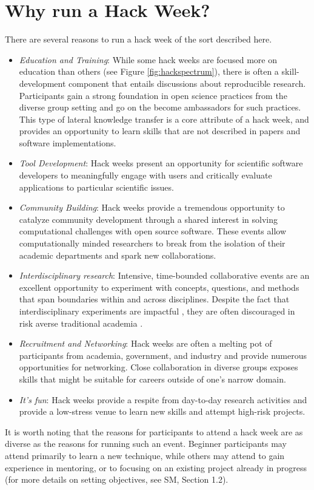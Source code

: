 \section*{Why run a Hack Week?}

There are several reasons to run a hack week of the sort described here.

\begin{itemize}
\item{\textit{Education and Training}:
While some hack weeks are focused more on education than others (see Figure \ref{fig:hackspectrum}), there is often a skill-development component that entails discussions about reproducible research. Participants gain a strong foundation in open science practices from the diverse group setting and go on the become ambassadors for such practices. This type of lateral knowledge transfer is a core attribute of a hack week, and provides an opportunity to learn skills that are not described in papers and software implementations.}

\item{\textit{Tool Development}: Hack weeks present an opportunity for scientific software developers to meaningfully engage with users and critically evaluate applications to particular scientific issues.}

\item{\textit{Community Building}: Hack weeks provide a tremendous opportunity to catalyze community development through a shared interest in solving computational challenges with open source software. These events allow computationally minded researchers to break from the isolation of their academic departments and spark new collaborations.}


\item{\textit{Interdisciplinary research}: Intensive, time-bounded collaborative events are an excellent opportunity to experiment with concepts, questions, and methods that span boundaries within and across disciplines. Despite the fact that interdisciplinary experiments are impactful \cite{Hall2012-hi}, they are often discouraged in risk averse traditional academia \cite{Sung2003-go}}.

\item{\textit{Recruitment and Networking}: Hack weeks are often a melting pot of participants from academia, government, and industry and provide numerous opportunities for networking. Close collaboration in diverse groups exposes skills that might be suitable for careers outside of one's narrow domain.}

\item{\textit{It's fun}: Hack weeks provide a respite from day-to-day research activities and provide a low-stress venue to learn new skills and attempt high-risk projects.}

\end{itemize}

\noindent It is worth noting that the reasons for participants to attend a hack week are as diverse as the reasons for running such an event.
Beginner participants may attend primarily to learn a new technique, while others may attend to gain experience in mentoring, or to focusing on an existing project already in progress (for more details on setting objectives, see SM, Section 1.2).

